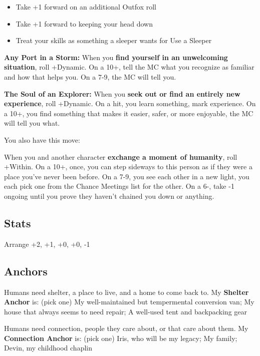 \documentclass[
  oneside,
  statementpaper,
  9pt]{memoir}
\begin{document}
\begin{itemize}
\tightlist
\item
  Take +1 forward on an additional Outfox roll
\item
  Take +1 forward to keeping your head down
\item
  Treat your skills as something a sleeper wants for Use a Sleeper
\end{itemize}

\textbf{Any Port in a Storm:} When you \textbf{find yourself in an
unwelcoming situation}, roll +Dynamic. On a 10+, tell the MC what you
recognize as familiar and how that helps you. On a 7-9, the MC will tell
you.

\textbf{The Soul of an Explorer:} When you \textbf{seek out or find an
entirely new experience}, roll +Dynamic. On a hit, you learn something,
mark experience. On a 10+, you find something that makes it easier,
safer, or more enjoyable, the MC will tell you what.

You also have this move:

When you and another character \textbf{exchange a moment of humanity},
roll +Within. On a 10+, once, you can step sideways to this person as if
they were a place you've never been before. On a 7-9, you see each other
in a new light, you each pick one from the Chance Meetings list for the
other. On a 6-, take -1 ongoing until you prove they haven't chained you
down or anything.

\hypertarget{stats-10}{%
\subsection{Stats}\label{stats-10}}

Arrange +2, +1, +0, +0, -1

\hypertarget{anchors-10}{%
\subsection{Anchors}\label{anchors-10}}

Humans need shelter, a place to live, and a home to come back to. My
\textbf{Shelter Anchor} is: (pick one) My well-maintained but
tempermental conversion van; My house that always seems to need repair;
A well-used tent and backpacking gear

Humans need connection, people they care about, or that care about them.
My \textbf{Connection Anchor} is: (pick one) Iris, who will be my
legacy; My family; Devin, my childhood chaplin
\end{document}
